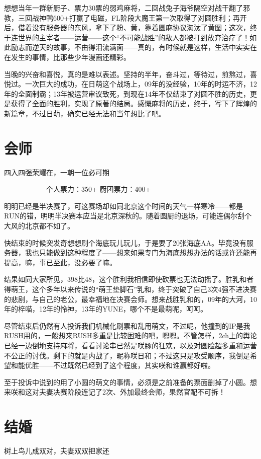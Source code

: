 想想当年一群新厨子、票力30票的弱鸡麻将，二回战兔子海爷隔空对战干翻了邪教，三回战神鸭600+打赢了电磁，FL阶段大魔王第一次取得了对圆胜利；再开后，借着没有服务器的东风，拿下了粉、黄，靠着圆麻协议淘汰了黄图；这次，终于连世界的主宰者——运营——这个“不可能战胜”的敌人都被打到放弃治疗了！如此励志而逆天的故事，不由得泪流满面——真的，有时候就是这样，生活中实实在在发生的事情，比那些少年漫画还精彩。

当晚的兴奋和喜悦，真的是难以表述。坚持的半年，奋斗过，等待过，煎熬过，喜悦过。一次巨大的成功，在日萌这个战场上，09年的没经验，10年的时运不济，12年的全面制霸；13年被运营审议致死，到现在14年不仅结束了对圆不胜的历史，更是获得了全面的胜利，实现了原著的结局。感慨麻将的历史，终于，写下了辉煌的新篇章，不过日萌，确实已经无法和当年想比了吧。


\section{会师}
四入四强荣耀在，一朝一位必可期

　　　　　　个人票力：350+ 厨团票力：400+

明明已经是半决赛了，可这赛场却如同北京这个时间的天气一样寒冷——都是RUN的错，明明半决赛本应当是北京深秋的。随着圆厨的退场，可能连偶尔刮个大风的北京都不如了。

快结束的时候突发奇想想刷个海底玩儿玩儿，于是要了20张海底AA。毕竟没有服务器，我也只能做到这种程度了——想来如果专门为海底想想办法的话或许还能再提高，嘛，事已至此，没必要了嘛。

结果如同大家所见，398比48，这个胜利我相信即使砍票也无法动摇了。胜乳和者得萌王，这个多年以来传说的“萌王垫脚石”乳和，终于突破了自己3次4强不进决赛的悲剧，与自己的老公，最幸福地在决赛会师。想来战胜乳和的，09年的大河，10年的梓喵，12年的怜神，13年的YUNE，哪个不是最萌呢，呵呵。

尽管结束后仍然有人投诉我们机械化刷票和乱用萌文，不过呢，他撞到的IP是我RUSH用的，一般想来RUSH多重是比较困难的吧，嗯嗯。不管怎样，2ch上的舆论已经一边倒地支持麻将，看看讨论串已然是咲豚的狂欢，以及对圆脸超多重和运营不公正的讨伐。剩下的就是内战了，昵称咲日和；不过这只是攻受顺序，我倒是希望和能优胜——不过既然已经到了这个程度，其实咲和谁赢都好啦。

至于投诉中说到的用了小圆的萌文的事情，必须是之前准备的票面删掉了小圆。想来咲和这对夫妻决赛阶段连记了2次、外加最终会师，果然官配不可拆！


\section{结婚}
树上鸟儿成双对，夫妻双双把家还

